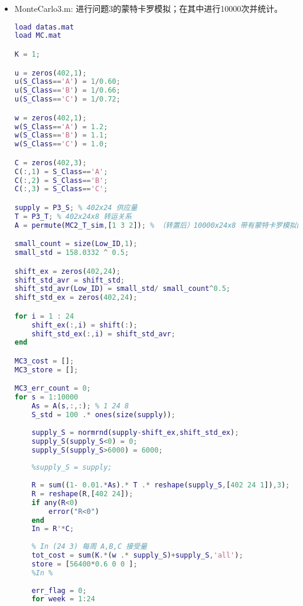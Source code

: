\documentclass{my_paper}
\begin{document}
\begin{itemize}
\begin{lstlisting}[language={Matlab}]
MC2_cost = []
MC2_store=[]
for i = 1:10000
    MonteCarlo2;
    MC2_cost=[MC2_cost,tot_cost];MC2_store=[MC2_store,store];
end

mean(MC2_cost)
std(MC2_cost)

MonteCarlo2_T;
\end{lstlisting}

\item MonteCarlo3.m: 进行问题3的蒙特卡罗模拟；在其中进行10000次并统计。
\begin{lstlisting}[language={Matlab}]
load datas.mat
load MC.mat

K = 1;

u = zeros(402,1);
u(S_Class=='A') = 1/0.60;
u(S_Class=='B') = 1/0.66;
u(S_Class=='C') = 1/0.72;

w = zeros(402,1);
w(S_Class=='A') = 1.2;
w(S_Class=='B') = 1.1;
w(S_Class=='C') = 1.0;

C = zeros(402,3);
C(:,1) = S_Class=='A';
C(:,2) = S_Class=='B';
C(:,3) = S_Class=='C';

supply = P3_S; % 402x24 供应量
T = P3_T; % 402x24x8 转运关系
A = permute(MC2_T_sim,[1 3 2]); % （转置后）10000x24x8 带有蒙特卡罗模拟的损耗率

small_count = size(Low_ID,1);
small_std = 158.0332 ^ 0.5;

shift_ex = zeros(402,24);
shift_std_avr = shift_std;
shift_std_avr(Low_ID) = small_std/ small_count^0.5;
shift_std_ex = zeros(402,24);

for i = 1 : 24
    shift_ex(:,i) = shift(:);
    shift_std_ex(:,i) = shift_std_avr;
end

MC3_cost = [];
MC3_store = [];

MC3_err_count = 0;
for s = 1:10000
    As = A(s,:,:); % 1 24 8
    S_std = 100 .* ones(size(supply));
    
    supply_S = normrnd(supply-shift_ex,shift_std_ex);
    supply_S(supply_S<0) = 0;
    supply_S(supply_S>6000) = 6000;
    
    %supply_S = supply;
    
    R = sum((1- 0.01.*As).* T .* reshape(supply_S,[402 24 1]),3);
    R = reshape(R,[402 24]);
    if any(R<0)
        error("R<0")
    end
    In = R'*C; 
    
    % In (24 3) 每周 A,B,C 接受量
    tot_cost = sum(K.*(w .* supply_S)+supply_S,'all');
    store = [56400*0.6 0 0 ];
    %In %
    
    err_flag = 0;
    for week = 1:24
        

\end{lstlisting}
\end{itemize}
\end{document}
